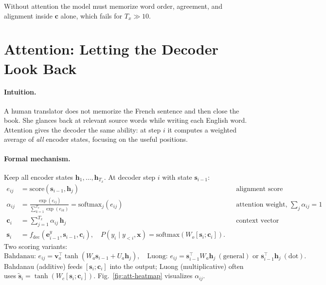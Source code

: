 Without attention the model must memorize word order, agreement, and alignment inside $\mathbf{c}$ alone, which fails for $T_x\gg 10$.

\section{Attention: Letting the Decoder Look Back}
\label{sec:attention}
\paragraph{Intuition.} A human translator does not memorize the French sentence and then close the book. She glances back at relevant source words while writing each English word. Attention gives the decoder the same ability: at step $i$ it computes a weighted average of \emph{all} encoder states, focusing on the useful positions.

\paragraph{Formal mechanism.} Keep all encoder states $\mathbf{h}_1,\dots,\mathbf{h}_{T_x}$. At decoder step $i$ with state $\mathbf{s}_{i-1}$:
\begin{align}
e_{ij} &= \mathrm{score}(\mathbf{s}_{i-1}, \mathbf{h}_j) &&\text{alignment score} \label{eq:score}\\
\alpha_{ij} &= \frac{\exp(e_{ij})}{\sum_{k=1}^{T_x}\exp(e_{ik})} = \mathrm{softmax}_j(e_{ij}) &&\text{attention weight, } \sum_j\alpha_{ij}=1 \label{eq:alpha}\\
\mathbf{c}_i &= \sum_{j=1}^{T_x} \alpha_{ij}\,\mathbf{h}_j &&\text{context vector (dynamic)} \label{eq:context}\\
\mathbf{s}_i &= f_{\text{dec}}(\mathbf{e}^y_{i-1}, \mathbf{s}_{i-1}, \mathbf{c}_i),\quad P(y_i\mid y_{<i},\mathbf{x})=\mathrm{softmax}(W_o[\mathbf{s}_i;\mathbf{c}_i]) . \label{eq:att-dec}
\end{align}
Two scoring variants:
\begin{equation}
\text{Bahdanau: } e_{ij}=\mathbf{v}_a^\top\tanh(W_a\mathbf{s}_{i-1}+U_a\mathbf{h}_j),\quad
\text{Luong: } e_{ij}=\mathbf{s}_{i-1}^\top W_a\mathbf{h}_j\ (\text{general}) \text{ or } \mathbf{s}_{i-1}^\top\mathbf{h}_j\ (\text{dot}).
\label{eq:score-variants}
\end{equation}
Bahdanau (additive) feeds $[\mathbf{s}_i;\mathbf{c}_i]$ into the output; Luong (multiplicative) often uses $\tilde{\mathbf{s}}_i=\tanh(W_c[\mathbf{s}_i;\mathbf{c}_i])$. Fig.~\ref{fig:att-heatmap} visualizes $\alpha_{ij}$.

